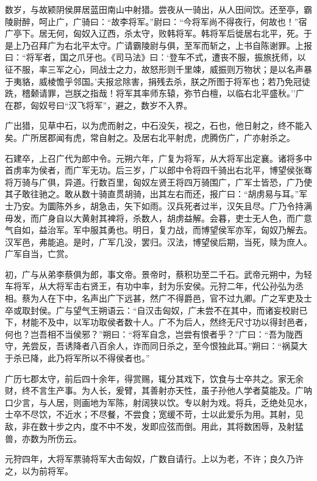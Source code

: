\documentclass[]{article}
\begin{document}
数岁，与故颍阴侯屏居蓝田南山中射猎。尝夜从一骑出，从人田间饮。还至亭，霸陵尉醉，呵止广，广骑曰：``故李将军。''尉曰：``今将军尚不得夜行，何故也！''宿广亭下。居无何，匈奴入辽西，杀太守，败韩将军。韩将军后徙居右北平，死。于是上乃召拜广为右北平太守。广请霸陵尉与俱，至军而斩之，上书自陈谢罪。上报曰：``将军者，国之爪牙也。《司马法》曰：`登车不式，遭丧不服，振旅抚师，以征不服，率三军之心，同战士之力，故怒形则千里竦，威振则万物状；是以名声暴于夷貉，威棱憺乎邻国。'夫报忿除害，捐残去杀，朕之所图于将军也；若乃免冠徒跣，稽颡请罪，岂朕之指哉！将军其率师东辕，弥节白檀，以临右北平盛秋。''广在郡，匈奴号曰``汉飞将军''，避之，数岁不入界。

广出猎，见草中石，以为虎而射之，中石没矢，视之，石也，他日射之，终不能入矣。广所居郡闻有虎，常自射之。及居右北平射虎，虎腾伤广，广亦射杀之。

石建卒，上召广代为郎中令。元朔六年，广复为将军，从大将军出定襄。诸将多中首虏率为侯者，而广军无功。后三岁，广以郎中令将四千骑出右北平，博望侯张骞将万骑与广俱，异道。行数百里，匈奴左贤王将四万骑围广，广军士皆恐，广乃使其子敢往驰之。敢从数十骑直贯胡骑，出其左右而还，报广曰：``胡虏易与耳。''军士乃安。为圜陈外乡，胡急击，矢下如雨。汉兵死者过半，汉矢且尽。广乃令持满毋发，而广身自以大黄射其裨将，杀数人，胡虏益解。会暮，吏士无人色，而广意气自如，益治军。军中服其勇也。明日，复力战，而博望侯军亦军，匈奴乃解去。汉军邑，弗能追。是时，广军几没，罢归。汉法，博望侯后期，当死，赎为庶人。广军自当，亡赏。

初，广与从弟李蔡俱为郎，事文帝。景帝时，蔡积功至二千石。武帝元朔中，为轻车将军，从大将军击右贤王，有功中率，封为乐安侯。元狩二年，代公孙弘为丞相。蔡为人在下中，名声出广下远甚，然广不得爵邑，官不过九卿。广之军吏及士卒或取封侯。广与望气王朔语云：``自汉击匈奴，广未尝不在其中，而诸妄校尉已下，材能不及中，以军功取侯者数十人。广不为后人，然终无尺寸功以得封邑者，何也？岂吾相不当侯邪？''朔曰：``将军自念，岂尝有恨者乎？''广曰：``吾为陇西守，羌尝反，吾诱降者八百余人，诈而同日杀之，至今恨独此耳。''朔曰：``祸莫大于杀已降，此乃将军所以不得侯者也。''

广历七郡太守，前后四十余年，得赏赐，辄分其戏下，饮食与士卒共之。家无余财，终不言生产事。为人长，爰臂，其善射亦天性，虽子孙他人学者莫能及。广呐口少言，与人居，则画地为军陈，射阔狭以饮。专以射为戏。将兵，乏绝处见水，士卒不尽饮，不近水；不尽餐，不尝食；宽缓不苛，士以此爱乐为用。其射，见敌，非在数十步之内，度不中不发，发即应弦而倒。用此，其将数困辱，及射猛兽，亦数为所伤云。

元狩四年，大将军票骑将军大击匈奴，广数自请行。上以为老，不许；良久乃许之，以为前将军。
\end{document}
